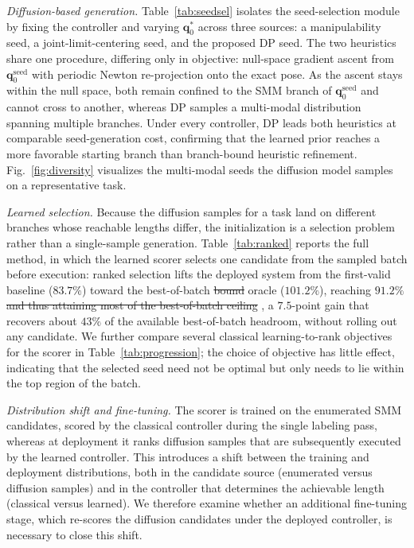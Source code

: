 \documentclass[journal, twoside]{IEEEtran}
\newcommand{\rev}[1]{\begingroup\color{magenta}#1\endgroup}
\newcommand{\rst}[1]{{\color{rstcolor}#1}}
\begin{document}
\rev{\emph{Diffusion-based generation.}}
Table~\ref{tab:seedsel} isolates the seed-selection module by fixing the controller and varying $\mathbf{q}_{0}^{*}$ across three sources: a manipulability seed, a joint-limit-centering seed, and the proposed DP seed. The two heuristics share one procedure, differing only in objective: null-space gradient ascent from $\mathbf{q}_{0}^{\mathrm{seed}}$ with periodic Newton re-projection onto the exact pose. As the ascent stays within the null space, both remain confined to the SMM branch of $\mathbf{q}_{0}^{\mathrm{seed}}$ and cannot cross to another, whereas DP samples a multi-modal distribution spanning multiple branches. \rev{Under every controller, DP leads both heuristics at comparable seed-generation cost, confirming that the learned prior reaches a more favorable starting branch than branch-bound heuristic refinement.} Fig.~\ref{fig:diversity} visualizes the multi-modal seeds the diffusion model samples on a representative task.

\rev{\emph{Learned selection.} Because the diffusion samples for a task land on different branches whose reachable lengths differ, the initialization is a selection problem rather than a single-sample generation. Table~\ref{tab:ranked} reports the full method, in which the learned scorer selects one candidate from the sampled batch before execution: ranked selection lifts the deployed system from the first-valid baseline ($83.7\%$) toward the best-of-batch \sout{bound} \rst{oracle} ($101.2\%$), reaching $91.2\%$ \sout{and thus attaining most of the best-of-batch ceiling} \rst{, a $7.5$-point gain that recovers about $43\%$ of the available best-of-batch headroom,} without rolling out any candidate. We further compare several classical learning-to-rank objectives for the scorer in Table~\ref{tab:progression}; the choice of objective has little effect, indicating that the selected seed need not be optimal but only needs to lie within the top region of the batch.}

\rev{\emph{Distribution shift and fine-tuning.} The scorer is trained on the enumerated SMM candidates, scored by the classical controller during the single labeling pass, whereas at deployment it ranks diffusion samples that are subsequently executed by the learned controller. This introduces a shift between the training and deployment distributions, both in the candidate source (enumerated versus diffusion samples) and in the controller that determines the achievable length (classical versus learned). We therefore examine whether an additional fine-tuning stage, which re-scores the diffusion candidates under the deployed controller, is necessary to close this shift.}
\end{document}
